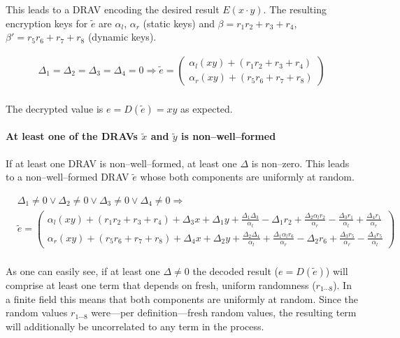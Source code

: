 This leads to a DRAV encoding the desired result $E(x \cdot y)$. The resulting
encryption keys for $\widetilde{e}$ are $\alpha_l$, $\alpha_r$ (static keys) and
$\beta = r_1r_2 + r_3 + r_4$, $\beta' = r_5r_6 + r_7 + r_8$ (dynamic keys).

\begin{align*}
  \Delta_1=\Delta_2=\Delta_3=\Delta_4=0 \Rightarrow
  \widetilde{e} =
  \begin{pmatrix}
    \alpha_l(xy) + (r_1r_2 + r_3 + r_4) \\
    \alpha_r(xy) + (r_5r_6 + r_7 + r_8)
  \end{pmatrix} \\
\end{align*}

\noindent{}The decrypted value is $e = D(\widetilde{e}) = xy$ as expected.


\paragraph{At least one of the DRAVs $\widetilde{x}$ and $\widetilde{y}$ is
non--well--formed} If at least one DRAV is non--well--formed, at least one
$\Delta$ is non--zero. This leads to a non--well--formed DRAV $\widetilde{e}$
whose both components are uniformly at random.

\begin{align*}
  &
  \Delta_1 \neq 0 \vee \Delta_2 \neq 0 \vee
  \Delta_3 \neq 0 \vee \Delta_4 \neq 0
  \Rightarrow \\
  &
  \widetilde{e} =
  \begin{pmatrix}
    \alpha_l(xy) + (r_1r_2 + r_3 + r_4)
    + \Delta_3x + \Delta_1y
    + \frac{\Delta_1\Delta_3}{\alpha_l}
    - \Delta_1r_2
    + \frac{\Delta_2\alpha_lr_2}{\alpha_r}
    - \frac{\Delta_3r_1}{\alpha_l}
    + \frac{\Delta_4r_1}{\alpha_r}
    \\
    \alpha_r(xy) + (r_5r_6 + r_7 + r_8)
    + \Delta_4x + \Delta_2y
    + \frac{\Delta_2\Delta_4}{\alpha_l}
    + \frac{\Delta_1\alpha_lr_6}{\alpha_r}
    - \Delta_2r_6
    + \frac{\Delta_3r_5}{\alpha_r}
    - \frac{\Delta_4r_5}{\alpha_l}
  \end{pmatrix} \\
\end{align*}

\noindent{}As one can easily see, if at least one $\Delta \neq 0$ the decoded
result ($e = D(\widetilde{e})$) will comprise at least one term that depends on
fresh, uniform randomness ($r_{1 \cdots 8}$). In a finite field this means that
both components are uniformly at random. Since the random values $r_{1 \cdots
8}$ were---per definition---fresh random values, the resulting term will
additionally be uncorrelated to any term in the process.


